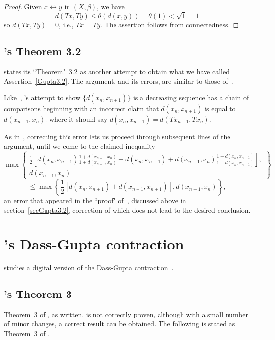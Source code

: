 \documentclass{article}
\numberwithin{thm}{section}
\newcommand{\adj}{\leftrightarrow}
\begin{document}
\begin{proof}
    Given $x \adj y$ in $(X,\beta)$,
    we have 
    \[ d(Tx,Ty) \le \theta(d(x,y))= \theta(1) < \sqrt{1} =1   
    \]
    so $d(Tx,Ty)=0$,
    i.e., $Tx=Ty$.
    The assertion
    follows from
    connectedness.
\end{proof}

\subsection{\cite{Pal}'s Theorem 3.2}
\cite{Pal} states its ``Theorem"~3.2 as
another attempt to
obtain what we have
called Assertion~\ref{Gupta3.2}. The argument, and
its errors, are similar to those
of~\cite{GuptaEtal}.

Like~\cite{GuptaEtal},
\cite{Pal}'s attempt
to show $\{d(x_n,x_{n+1}) \}$
is a decreasing sequence has a chain
of comparisons beginning with 
an incorrect claim
that $d(x_n,x_{n+1})$
is equal to 
$d(x_{n-1},x_n)$,
where it should say
$d(x_n,x_{n+1}) =
d(Tx_{n-1},Tx_n)$.

As in~\cite{GuptaEtal},
correcting this error
lets us proceed through subsequent
lines of the argument,
until we come to the
claimed inequality
\[ \max \left \{
\begin{array}{c}
\frac{1}{2} \left [
d(x_n,x_{n+1})
\frac{1+d(x_{n-1},x_n)}{1+d(x_{n-1},x_n)} + d(x_n,x_{n+1}) +
d(x_{n-1},x_n)
\frac{1+d(x_n,x_{n+1})}{1+d(x_n,x_{n+1})}
\right ], \\ d(x_{n-1},x_n) \end{array}
\right \}
\]
\[ \le \max \left \{
\frac{1}{2}[d(x_n,x_{n+1}) +
 d(x_{n-1},x_{n+1})],
 d(x_{n-1},x_n)
\right \},
\]
an error that appeared in the
``proof" of~\cite{GuptaEtal},
discussed above in section~\ref{secGupta3.2},
correction of which does not lead
to the desired conclusion.

\section{\cite{SalJh}'s Dass-Gupta contraction}
\cite{SalJh} studies a digital version of
the Dass-Gupta contraction~\cite{DassGup}.

\subsection{\cite{SalJh}'s Theorem 3}
Theorem~3 of \cite{SalJh}, as written, is not
correctly proven, although with a small
number of minor changes, a correct result can be obtained. 
The following is stated as Theorem~3 of \cite{SalJh}.
\end{document}
